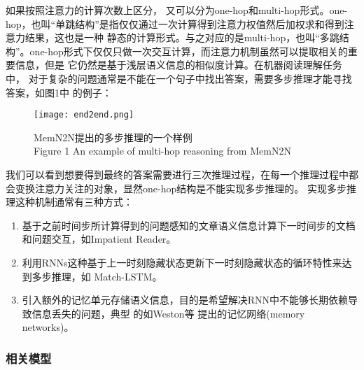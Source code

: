 如果按照注意力的计算次数上区分，
又可以分为one-hop和multi-hop形式。one-hop，也叫“单跳结构”是指仅仅通过一次计算得到注意力权值然后加权求和得到注意力结果，这也是一种
静态的计算形式。与之对应的是multi-hop，也叫“多跳结构”。one-hop形式下仅仅只做一次交互计算，而注意力机制虽然可以提取相关的重要信息，但是
它仍然是基于浅层语义信息的相似度计算。在机器阅读理解任务中，
对于复杂的问题通常是不能在一个句子中找出答案，需要多步推理才能寻找答案，如图1中
的例子：
\begin{figure}[ht]
    \centering
    \texttt{[image: end2end.png]}
    \caption{MemN2N提出的多步推理的一个样例 \\ Figure 1 An example of multi-hop reasoning from MemN2N}
\end{figure}
我们可以看到想要得到最终的答案需要进行三次推理过程，在每一个推理过程中都会变换注意力关注的对象，显然one-hop结构是不能实现多步推理的。
实现多步推理这种机制通常有三种方式：
\begin{enumerate}
\item 基于之前时间步所计算得到的问题感知的文章语义信息计算下一时间步的文档和问题交互，如Impatient Reader。
\item 利用RNNs这种基于上一时刻隐藏状态更新下一时刻隐藏状态的循环特性来达到多步推理，如
Match-LSTM。
\item 引入额外的记忆单元存储语义信息，目的是希望解决RNN中不能够长期依赖导致信息丢失的问题，典型
的如Weston等
提出的记忆网络(memory networks)。
\end{enumerate}


\subsubsection{相关模型}

